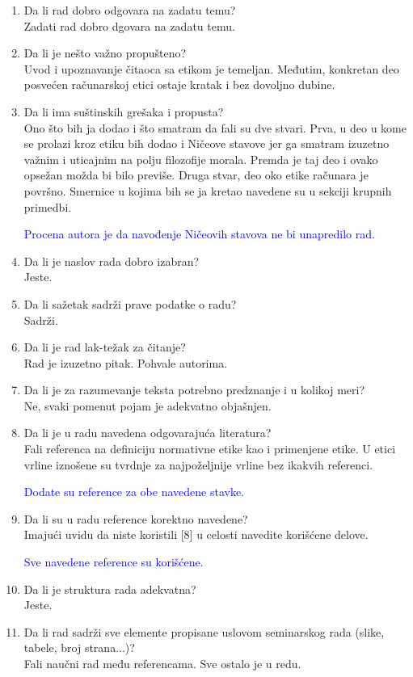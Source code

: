 \documentclass[a4paper]{report}
\newcommand{\odgovor}[1]{\textcolor{blue}{#1}}
\begin{document}
\begin{enumerate}
\item Da li rad dobro odgovara na zadatu temu?\\
Zadati rad dobro dgovara na zadatu temu.
\item Da li je nešto važno propušteno?\\
Uvod i upoznavanje čitaoca sa etikom je temeljan. Međutim, konkretan deo posvećen računarskoj etici ostaje kratak i bez dovoljno dubine.
\item Da li ima suštinskih grešaka i propusta?\\
Ono što bih ja dodao i što smatram da fali su dve stvari. Prva, u deo u kome se prolazi kroz etiku bih dodao i Ničeove stavove jer ga smatram izuzetno važnim i uticajnim na polju filozofije morala. 
Premda je taj deo i ovako opsežan možda bi bilo previše. Druga stvar, deo oko etike računara je površno. Smernice u kojima bih se ja kretao navedene su u sekciji krupnih primedbi.

\odgovor{Procena autora je da navođenje Ničeovih stavova ne bi unapredilo rad.}

\item Da li je naslov rada dobro izabran?\\
Jeste.
\item Da li sažetak sadrži prave podatke o radu?\\
Sadrži.
\item Da li je rad lak-težak za čitanje?\\
Rad je izuzetno pitak. Pohvale autorima.
\item Da li je za razumevanje teksta potrebno predznanje i u kolikoj meri?\\
Ne, svaki pomenut pojam je adekvatno objašnjen.
\item Da li je u radu navedena odgovarajuća literatura?\\
Fali referenca na definiciju normativne etike kao i primenjene etike. U etici vrline iznošene su tvrdnje za 
najpoželjnije vrline bez ikakvih referenci.

\odgovor{Dodate su reference za obe navedene stavke.}

\item Da li su u radu reference korektno navedene?\\
Imajući uvidu da niste koristili [8] u celosti navedite korišćene delove.

\odgovor{Sve navedene reference su korišćene. }

\item Da li je struktura rada adekvatna?\\
Jeste.
\item Da li rad sadrži sve elemente propisane uslovom seminarskog rada (slike, tabele, broj strana...)?\\
Fali naučni rad među referencama. Sve ostalo je u redu.


\end{enumerate}
\end{document}
